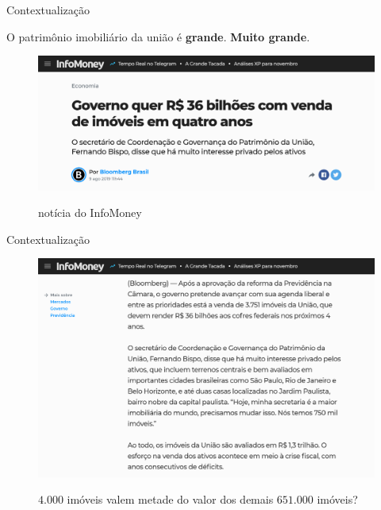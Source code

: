 \documentclass[10pt]{beamer}
\begin{document}
\begin{frame}[fragile]{Contextualização}

    O patrimônio imobiliário da união é \textbf{grande}. \textbf{Muito grande}.
    
    \begin{figure}
        \centering
        \caption{notícia do InfoMoney}
        \includegraphics[width=\linewidth]{demo/images/noticia2_multiply.png}
        \label{fig:noticia2}
    \end{figure}
    
\end{frame}

\begin{frame}[fragile]{Contextualização}
    
    \begin{figure}
        \centering
        \caption{$4.000$ imóveis valem metade do valor dos demais $651.000$ imóveis?}
        \includegraphics[width=\linewidth]{demo/images/noticia2_conteudo2_multiply.png}
        \label{fig:noticia2}
    \end{figure}
    
\end{frame}
\end{document}
